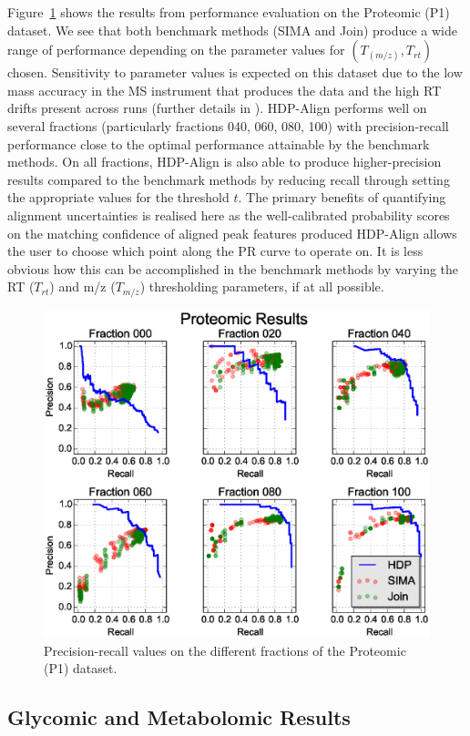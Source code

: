 Figure~\ref{fig:proteomic_results} shows the results from performance evaluation on the Proteomic (P1) dataset. We see that both benchmark methods (SIMA and Join) produce a wide range of performance depending on the parameter values for $(T_{(m/z)}, T_{rt})$ chosen. Sensitivity to parameter values is expected on this dataset due to the low mass accuracy in the MS instrument that produces the data and the high \ac{RT} drifts present across runs (further details in \cite{Lange2008}). HDP-Align performs well on several fractions (particularly fractions 040, 060, 080, 100) with precision-recall performance close to the optimal performance attainable by the benchmark methods. On all fractions, HDP-Align is also able to produce higher-precision results compared to the benchmark methods by reducing recall through setting the appropriate values for the threshold $t$. The primary benefits of quantifying alignment uncertainties is realised here as the well-calibrated probability scores on the matching confidence of aligned peak features produced HDP-Align allows the user to choose which point along the PR curve to operate on. It is less obvious how this can be accomplished in the benchmark methods by varying the \ac{RT} ($T_{rt}$) and m/z ($T_{m/z}$) thresholding parameters, if at all possible.

\begin{figure}[!htbp]
\centering\includegraphics[width=0.7\linewidth]{06-hdp/figures/figure_4.eps}
\centering\caption{\label{fig:proteomic_results}Precision-recall values on the different fractions of the Proteomic (P1) dataset.}
\end{figure}

\subsection{Glycomic and Metabolomic Results}
\label{sub:glycomic-metabolomic-results}

